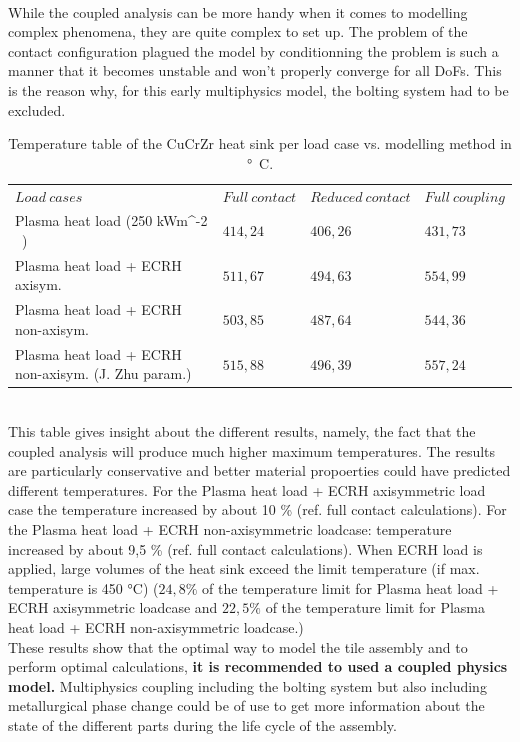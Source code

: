 \\
\break
\normalsize{\indent While the coupled analysis can be more handy when it comes to modelling complex phenomena, they are quite complex to set up. The problem of the contact configuration plagued the model by conditionning the problem is such a manner that it becomes unstable and won't properly converge for all \acrshort{DoF}s. This is the reason why, for this early multiphysics model, the bolting system had to be excluded.}
\\
\begin{table}[h!]
    \centering
    \begin{tabular}{p{}p{2cm}p{}p{2cm} }
    \toprule
    $Load \ cases$ & $Full \ contact$ & $Reduced \ contact$ & $Full \ coupling$ \\
    \cmidrule{1-4}

    Plasma heat load (250 \unit{kWm^{-2} }) & $414,24$ & $406,26$ & $431,73$\\
    \myrowcolour
    Plasma heat load + \acrshort{ECRH} axisym. & $511,67$ & $494,63$ & $554,99$\\
    Plasma heat load + \acrshort{ECRH} non-axisym. & $503,85$ & $487,64$ & $544,36$\\
    \myrowcolour
    Plasma heat load + \acrshort{ECRH} non-axisym. (J. Zhu param.) & $515,88$ & $496,39$ & $557,24$\\

\bottomrule
\end{tabular}
\caption{Temperature table of the \acrshort{CuCrZr} heat sink per load case vs. modelling method in \unit{\si{\degree}C}. }
\end{table}
\\
\normalsize{\indent This table gives insight about the different results, namely, the fact that the coupled analysis will produce much higher maximum temperatures. The results are particularly conservative and better material propoerties could have predicted different temperatures. For the Plasma heat load + \acrshort{ECRH} axisymmetric load case the temperature increased by about 10 \% (ref. full contact calculations). For the Plasma heat load + \acrshort{ECRH} non-axisymmetric loadcase: temperature increased by about 9,5 \% (ref. full contact calculations). When \acrshort{ECRH} load is applied, large volumes of the heat sink exceed the limit temperature (if max. temperature is 450 \si{\degree}C) ($24,8 \%$ of the temperature limit for Plasma heat load + \acrshort{ECRH} axisymmetric loadcase and $22,5 \%$ of the temperature limit for Plasma heat load + \acrshort{ECRH} non-axisymmetric loadcase.) }
\\
\break
\normalsize{These results show that the optimal way to model the tile assembly and to perform optimal calculations, {\bfseries it is recommended to used a coupled physics model.} Multiphysics coupling including the bolting system but also including metallurgical phase change could be of use to get more information about the state of the different parts during the life cycle of the assembly.}